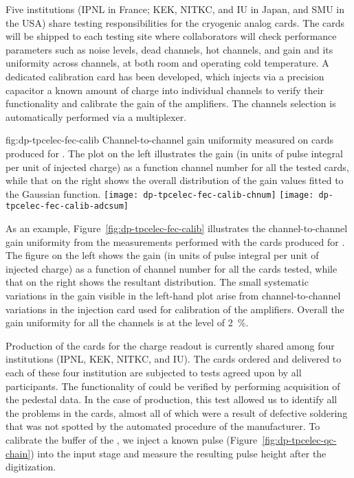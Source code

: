 Five institutions (IPNL in France; KEK, NITKC, and IU in Japan, and SMU in the USA) share testing responsibilities for the cryogenic  analog cards. The cards will be shipped to each testing site where collaborators will check performance parameters such as noise levels, dead channels, hot channels, and gain and its uniformity across channels, at both room and operating cold temperature. A dedicated calibration card has been developed, which injects via a precision capacitor a known amount of charge into individual  channels to verify their functionality and calibrate the gain of the amplifiers. The channels selection is automatically performed via a multiplexer.

\begin{dunefigure}{fig:dp-tpcelec-fec-calib}
{Channel-to-channel gain uniformity measured on  cards produced for . The plot on the left illustrates the gain (in units of pulse integral per unit of injected charge) as a function channel number for all the tested cards, while that on the right shows the overall distribution of the gain values fitted to the Gaussian function.}
\texttt{[image: dp-tpcelec-fec-calib-chnum]}
\texttt{[image: dp-tpcelec-fec-calib-adcsum]}
\end{dunefigure}

As an example, Figure~\ref{fig:dp-tpcelec-fec-calib} illustrates the channel-to-channel gain uniformity from the measurements performed with the  cards produced for . The figure on the left shows the gain (in units of pulse integral per unit of injected charge) as a function of channel number for all the cards tested, while that on the right shows the resultant distribution. The small systematic variations in the gain visible in the left-hand plot  arise from channel-to-channel variations in the injection card used for calibration of the  amplifiers. Overall the gain uniformity for all the channels is at the level of \SI{2}{\percent}.

Production of the  cards for the charge readout is currently shared among four institutions (IPNL, KEK, NITKC, and IU). 
The cards ordered and delivered to each of these four institution are subjected to  tests agreed upon by all participants. 
The functionality of  could be verified by performing acquisition of the pedestal data. In the case of  production, this test allowed us to identify all the problems in the cards, almost all of which were a result of defective soldering that was not spotted by the automated  procedure of the manufacturer. To calibrate the  buffer of the  , we inject a known pulse (Figure~\ref{fig:dp-tpcelec-qc-chain}) into the input stage and measure the resulting pulse height after the digitization. 


